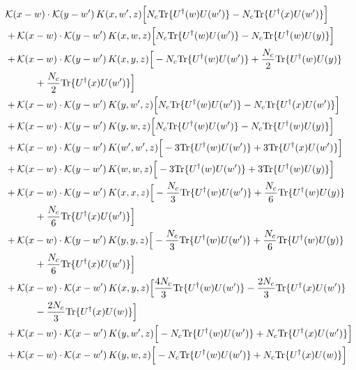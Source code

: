 \documentclass[10pt]{article}
\numberwithin{equation}{section}
\begin{document}
\begin{align}
&\mathcal K(x-w)\cdot\mathcal K(y-w')\,K(x,w',z)\Big[N_c{\rm Tr}\{U^\dagger(w)U(w')\}-N_c{\rm Tr}\{U^\dagger(x)U(w')\}\Big]\notag\\
&+\mathcal K(x-w)\cdot\mathcal K(y-w')\,K(x,w,z)\Big[N_c{\rm Tr}\{U^\dagger(w)U(w')\}-N_c{\rm Tr}\{U^\dagger(w)U(y)\}\Big]\notag\\
&+\mathcal K(x-w)\cdot\mathcal K(y-w')\,K(x,y,z)\Big[-N_c{\rm Tr}\{U^\dagger(w)U(w')\}+\frac{N_c}{2}{\rm Tr}\{U^\dagger(w)U(y)\}\notag\\
&\quad\quad\quad+\frac{N_c}{2}{\rm Tr}\{U^\dagger(x)U(w')\}\Big]\notag\\
&+\mathcal K(x-w)\cdot\mathcal K(y-w')\,K(y,w',z)\Big[N_c{\rm Tr}\{U^\dagger(w)U(w')\}-N_c{\rm Tr}\{U^\dagger(x)U(w')\}\Big]\notag\\
&+\mathcal K(x-w)\cdot\mathcal K(y-w')\,K(y,w,z)\Big[N_c{\rm Tr}\{U^\dagger(w)U(w')\}-N_c{\rm Tr}\{U^\dagger(w)U(y)\}\Big]\notag\\
&+\mathcal K(x-w)\cdot\mathcal K(y-w')\,K(w',w',z)\Big[-3{\rm Tr}\{U^\dagger(w)U(w')\}+3{\rm Tr}\{U^\dagger(x)U(w')\}\Big]\notag\\
&+\mathcal K(x-w)\cdot\mathcal K(y-w')\,K(w,w,z)\Big[-3{\rm Tr}\{U^\dagger(w)U(w')\}+3{\rm Tr}\{U^\dagger(w)U(y)\}\Big]\notag\\
&+\mathcal K(x-w)\cdot\mathcal K(y-w')\,K(x,x,z)\Big[-\frac{N_c}{3}{\rm Tr}\{U^\dagger(w)U(w')\}+\frac{N_c}{6}{\rm Tr}\{U^\dagger(w)U(y)\}\notag\\
&\quad\quad\quad+\frac{N_c}{6}{\rm Tr}\{U^\dagger(x)U(w')\}\Big]\notag\\
&+\mathcal K(x-w)\cdot\mathcal K(y-w')\,K(y,y,z)\Big[-\frac{N_c}{3}{\rm Tr}\{U^\dagger(w)U(w')\}+\frac{N_c}{6}{\rm Tr}\{U^\dagger(w)U(y)\}\notag\\
&\quad\quad\quad+\frac{N_c}{6}{\rm Tr}\{U^\dagger(x)U(w')\}\Big]\notag\\
&+\mathcal K(x-w)\cdot\mathcal K(x-w')\,K(x,y,z)\Big[\frac{4 N_c}{3}{\rm Tr}\{U^\dagger(w)U(w')\}-\frac{2 N_c}{3}{\rm Tr}\{U^\dagger(x)U(w')\}\notag\\
&\quad\quad\quad-\frac{2 N_c}{3}{\rm Tr}\{U^\dagger(x)U(w)\}\Big]\notag\\
&+\mathcal K(x-w)\cdot\mathcal K(x-w')\,K(y,w',z)\Big[-N_c{\rm Tr}\{U^\dagger(w)U(w')\}+N_c{\rm Tr}\{U^\dagger(x)U(w')\}\Big]\notag\\
&+\mathcal K(x-w)\cdot\mathcal K(x-w')\,K(y,w,z)\Big[-N_c{\rm Tr}\{U^\dagger(w)U(w')\}+N_c{\rm Tr}\{U^\dagger(x)U(w)\}\Big]
\label{eq:G1IIa}
\end{align}
\end{document}
